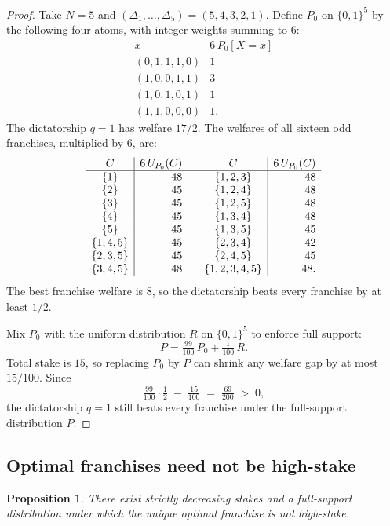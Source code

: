 \documentclass{article}
\theoremstyle{plain}
\newtheorem{proposition}{Proposition}
\theoremstyle{definition}
\begin{document}
\begin{proof}
Take $N = 5$ and $(\Delta_1, \ldots, \Delta_5) = (5, 4, 3, 2, 1)$.  Define $P_0$ on $\{0,1\}^5$ by the following four atoms, with integer weights summing to $6$:
\[
\begin{array}{c|r}
x & 6\, P_0[X = x] \\
\hline
(0,1,1,1,0) & 1 \\
(1,0,0,1,1) & 3 \\
(1,0,1,0,1) & 1 \\
(1,1,0,0,0) & 1 .
\end{array}
\]
The dictatorship $q = 1$ has welfare $17/2$.  The welfares of all sixteen odd franchises, multiplied by $6$, are:
\[
\begin{array}{c|r@{\qquad}c|r}
C & 6\, U_{P_0}(C) & C & 6\, U_{P_0}(C) \\
\hline
\{1\}         & 48 & \{1,2,3\}     & 48 \\
\{2\}         & 45 & \{1,2,4\}     & 48 \\
\{3\}         & 45 & \{1,2,5\}     & 48 \\
\{4\}         & 45 & \{1,3,4\}     & 48 \\
\{5\}         & 45 & \{1,3,5\}     & 45 \\
\{1,4,5\}     & 45 & \{2,3,4\}     & 42 \\
\{2,3,5\}     & 45 & \{2,4,5\}     & 45 \\
\{3,4,5\}     & 48 & \{1,2,3,4,5\} & 48 .
\end{array}
\]
The best franchise welfare is $8$, so the dictatorship beats every franchise by at least $1/2$.

Mix $P_0$ with the uniform distribution $R$ on $\{0,1\}^5$ to enforce full support:
\[
    P = \tfrac{99}{100}\, P_0 + \tfrac{1}{100}\, R .
\]
Total stake is $15$, so replacing $P_0$ by $P$ can shrink any welfare gap by at most $15/100$.  Since
\[
    \tfrac{99}{100}\cdot\tfrac{1}{2} \;-\; \tfrac{15}{100}
    \;=\; \tfrac{69}{200} \;>\; 0,
\]
the dictatorship $q = 1$ still beats every franchise under the full-support distribution $P$.
\end{proof}

\subsection{Optimal franchises need not be high-stake}

\begin{proposition}\label{prop:high-stake}
There exist strictly decreasing stakes and a full-support distribution under which the unique optimal franchise is not high-stake.
\end{proposition}
\end{document}
